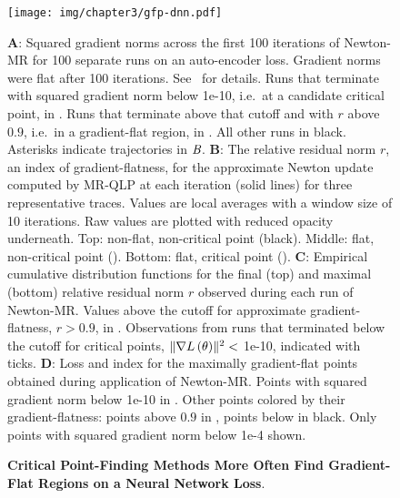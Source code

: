 \documentclass[../../thesis.tex]{subfiles}
\begin{document}
\begin{figure}[htpb]
	\begin{center}
	    \texttt{[image: img/chapter3/gfp-dnn.pdf]}
	\end{center}
	\caption{\textbf{Critical Point-Finding Methods
	More Often Find Gradient-Flat Regions
	on a Neural Network Loss}.}{%
	\textbf{A}:
	Squared gradient norms across the first 100 iterations of Newton-MR
	for 100 separate runs on an auto-encoder loss.
	Gradient norms were flat after 100 iterations.
	See~ for details.
	Runs that terminate with squared gradient norm below 1e-10,
	i.e.~at a candidate critical point, in \successcolor{}.
	Runs that terminate above that cutoff and with $r$ above $0.9$,
	i.e.~in a gradient-flat region, in \failcolor{}.
	All other runs in black.
	Asterisks indicate trajectories in $\emph{B}$.
	\textbf{B}:
	The relative residual norm $r$,
	an index of gradient-flatness,
	for the approximate Newton update
	computed by MR-QLP at each iteration
	(solid lines)
	for three representative traces.
	Values are local averages with a window size of 10 iterations.
	Raw values are plotted with reduced opacity underneath.
	Top: non-flat, non-critical point (black).
	Middle: flat, non-critical point (\failcolor{}).
	Bottom: flat, critical point (\successcolor{}).
	\textbf{C}:
	Empirical cumulative distribution functions for
	the final (top) and maximal (bottom) relative residual norm $r$ observed
	during each run of Newton-MR\@.
	Values above the cutoff for approximate gradient-flatness, $r>0.9$,
	in \failcolor{}.
	Observations from runs that terminated below the cutoff for critical points,
	$\lVert\nabla L\left(\theta\right)\rVert^2 <$ 1e-10,
	indicated with \successcolor{} ticks.
	\textbf{D}:
	Loss and index for the maximally gradient-flat points
	obtained during application of Newton-MR\@.
	Points with squared gradient norm below 1e-10 in \successcolor{}.
	Other points colored by their gradient-flatness:
	points above $0.9$ in \failcolor{}, points below in black.
	Only points with squared gradient norm below 1e-4 shown.
	}
\end{figure}
\end{document}
